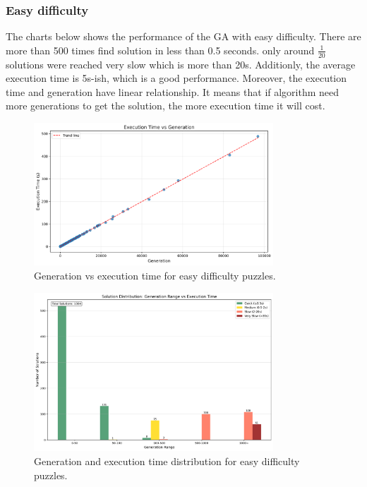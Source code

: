 \subsubsection{Easy difficulty}

The charts below shows the performance of the GA with easy difficulty. There are more than 500 times find solution in less than 0.5 seconds. only around \(\frac{1}{20}\) solutions were reached very slow which is more than 20s.
Additionly, the average execution time is 5s-ish, which is a good performance. Moreover, the execution time and generation have linear relationship. It means that if algorithm need more generations to get the solution, the more execution time it will cost.

\begin{figure}[H]
\centering
\includegraphics[width=0.8\textwidth]{resources/generation_vs_execution_time_easy.png}
\caption{Generation vs execution time for easy difficulty puzzles.}
\label{fig:generation_vs_execution_time_easy}
\end{figure}

\begin{figure}[H]
\centering
\includegraphics[width=0.8\textwidth]{resources/generation_execution_time_bars_easy.png}
\caption{Generation and execution time distribution for easy difficulty puzzles.}
\label{fig:generation_execution_time_bars_easy}
\end{figure}

